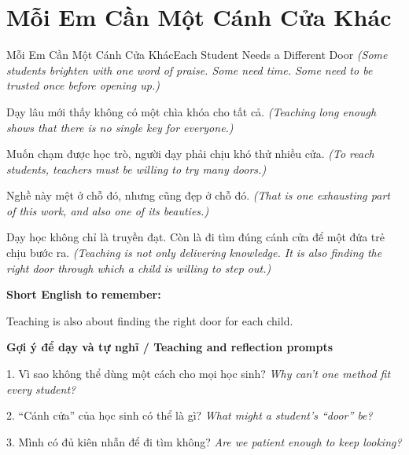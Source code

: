 \section{Mỗi Em Cần Một Cánh Cửa Khác}
\begin{truyen}{Mỗi Em Cần Một Cánh Cửa Khác}{Each Student Needs a Different Door}
\textit{(Some students brighten with one word of praise. Some need time. Some need to be trusted once before opening up.)}

Dạy lâu mới thấy không có một chìa khóa cho tất cả.
\textit{(Teaching long enough shows that there is no single key for everyone.)}

Muốn chạm được học trò, người dạy phải chịu khó thử nhiều cửa.
\textit{(To reach students, teachers must be willing to try many doors.)}

Nghề này mệt ở chỗ đó, nhưng cũng đẹp ở chỗ đó.
\textit{(That is one exhausting part of this work, and also one of its beauties.)}

\end{truyen}

\begin{baihoc}
Dạy học không chỉ là truyền đạt. Còn là đi tìm đúng cánh cửa để một đứa trẻ chịu bước ra.
\textit{(Teaching is not only delivering knowledge. It is also finding the right door through which a child is willing to step out.)}
\end{baihoc}

\begin{ghinhoanh}
\textbf{Short English to remember:}

Teaching is also about finding the right door for each child.

\end{ghinhoanh}

\begin{tuhocnhanh}
\textbf{Gợi ý để dạy và tự nghĩ / Teaching and reflection prompts}

1. Vì sao không thể dùng một cách cho mọi học sinh? \textit{Why can’t one method fit every student?}

2. “Cánh cửa” của học sinh có thể là gì? \textit{What might a student’s “door” be?}

3. Mình có đủ kiên nhẫn để đi tìm không? \textit{Are we patient enough to keep looking?}
\end{tuhocnhanh}
\ngancach

